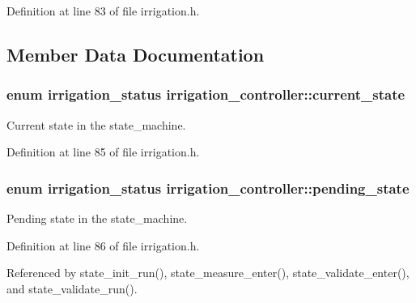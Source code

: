 Definition at line 83 of file irrigation.\+h.



\subsection{Member Data Documentation}
\hypertarget{structirrigation__controller_a80bec16de2d6f98564ed1487dee041c5}{}
\subsubsection[{current\+\_\+state}]{\setlength{\rightskip}{0pt plus 5cm}enum {\bf irrigation\+\_\+status} irrigation\+\_\+controller\+::current\+\_\+state}\label{structirrigation__controller_a80bec16de2d6f98564ed1487dee041c5}


Current state in the state\+\_\+machine. 



Definition at line 85 of file irrigation.\+h.

\hypertarget{structirrigation__controller_a7e1c5689983d2b8aae434c2d5442c935}{}
\subsubsection[{pending\+\_\+state}]{\setlength{\rightskip}{0pt plus 5cm}enum {\bf irrigation\+\_\+status} irrigation\+\_\+controller\+::pending\+\_\+state}\label{structirrigation__controller_a7e1c5689983d2b8aae434c2d5442c935}


Pending state in the state\+\_\+machine. 



Definition at line 86 of file irrigation.\+h.



Referenced by state\+\_\+init\+\_\+run(), state\+\_\+measure\+\_\+enter(), state\+\_\+validate\+\_\+enter(), and state\+\_\+validate\+\_\+run().

\hypertarget{structirrigation__controller_a68a854df15c9234d24f2ad36b990bfa8}{}
